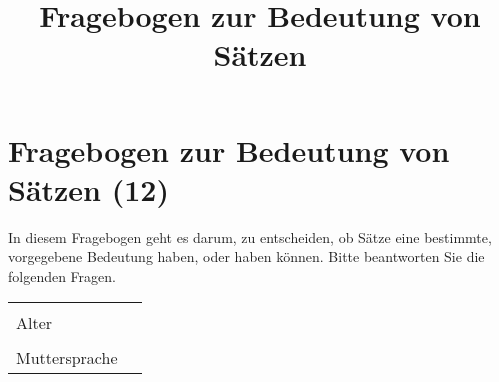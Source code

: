 \documentclass[a4paper, 8pt]{article}
\title{Fragebogen zur Bedeutung von Sätzen}
\begin{document}
\section*{Fragebogen zur Bedeutung von Sätzen (12)}

In diesem Fragebogen geht es darum, zu entscheiden, ob Sätze eine bestimmte, vorgegebene Bedeutung haben, oder haben können. Bitte beantworten Sie die folgenden Fragen.


\begin{tabular}{|l|p{5cm}|}
\hline
& \\
Alter & \\
\hline
& \\
Muttersprache & \\
\hline
\end{tabular}
\end{document}
